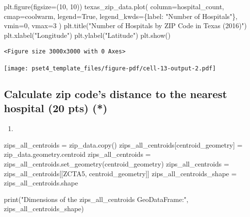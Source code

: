 \documentclass[
  letterpaper,
  DIV=11,
  numbers=noendperiod]{scrartcl}
\newenvironment{Shaded}{\begin{snugshade}}{\end{snugshade}}
\newcommand{\BuiltInTok}[1]{\textcolor[rgb]{0.00,0.23,0.31}{#1}}
\newcommand{\DecValTok}[1]{\textcolor[rgb]{0.68,0.00,0.00}{#1}}
\newcommand{\NormalTok}[1]{\textcolor[rgb]{0.00,0.23,0.31}{#1}}
\newcommand{\OperatorTok}[1]{\textcolor[rgb]{0.37,0.37,0.37}{#1}}
\newcommand{\StringTok}[1]{\textcolor[rgb]{0.13,0.47,0.30}{#1}}
\newcommand{\VariableTok}[1]{\textcolor[rgb]{0.07,0.07,0.07}{#1}}
\providecommand{\tightlist}{%
  \setlength{\itemsep}{0pt}\setlength{\parskip}{0pt}}\usepackage{longtable,booktabs,array}
\begin{document}
\begin{Shaded}
\begin{Highlighting}[]
\NormalTok{plt.figure(figsize}\OperatorTok{=}\NormalTok{(}\DecValTok{10}\NormalTok{, }\DecValTok{10}\NormalTok{))}
\NormalTok{texas\_zip\_data.plot(}
\NormalTok{    column}\OperatorTok{=}\StringTok{\textquotesingle{}hospital\_count\textquotesingle{}}\NormalTok{,}
\NormalTok{    cmap}\OperatorTok{=}\StringTok{\textquotesingle{}coolwarm\textquotesingle{}}\NormalTok{,}
\NormalTok{    legend}\OperatorTok{=}\VariableTok{True}\NormalTok{,}
\NormalTok{    legend\_kwds}\OperatorTok{=}\NormalTok{\{}\StringTok{\textquotesingle{}label\textquotesingle{}}\NormalTok{: }\StringTok{"Number of Hospitals"}\NormalTok{\},}
\NormalTok{    vmin}\OperatorTok{=}\DecValTok{0}\NormalTok{,}
\NormalTok{    vmax}\OperatorTok{=}\DecValTok{3}
\NormalTok{)}
\NormalTok{plt.title(}\StringTok{"Number of Hospitals by ZIP Code in Texas (2016)"}\NormalTok{)}
\NormalTok{plt.xlabel(}\StringTok{"Longitude"}\NormalTok{)}
\NormalTok{plt.ylabel(}\StringTok{"Latitude"}\NormalTok{)}
\NormalTok{plt.show()}
\end{Highlighting}
\end{Shaded}

\begin{verbatim}
<Figure size 3000x3000 with 0 Axes>
\end{verbatim}

\texttt{[image: pset4\_template\_files/figure-pdf/cell-13-output-2.pdf]}

\subsection{Calculate zip code's distance to the nearest hospital (20
pts)
(*)}\label{calculate-zip-codes-distance-to-the-nearest-hospital-20-pts}

\begin{enumerate}
\def\labelenumi{\arabic{enumi}.}
\tightlist
\item
\end{enumerate}

\begin{Shaded}
\begin{Highlighting}[]
\NormalTok{zips\_all\_centroids }\OperatorTok{=}\NormalTok{ zip\_data.copy()}
\NormalTok{zips\_all\_centroids[}\StringTok{\textquotesingle{}centroid\_geometry\textquotesingle{}}\NormalTok{] }\OperatorTok{=}\NormalTok{ zip\_data.geometry.centroid}
\NormalTok{zips\_all\_centroids }\OperatorTok{=}\NormalTok{ zips\_all\_centroids.set\_geometry(}\StringTok{\textquotesingle{}centroid\_geometry\textquotesingle{}}\NormalTok{)}
\NormalTok{zips\_all\_centroids }\OperatorTok{=}\NormalTok{ zips\_all\_centroids[[}\StringTok{\textquotesingle{}ZCTA5\textquotesingle{}}\NormalTok{, }\StringTok{\textquotesingle{}centroid\_geometry\textquotesingle{}}\NormalTok{]]}
\NormalTok{zips\_all\_centroids\_shape }\OperatorTok{=}\NormalTok{ zips\_all\_centroids.shape}

\BuiltInTok{print}\NormalTok{(}\StringTok{"Dimensions of the zips\_all\_centroids GeoDataFrame:"}\NormalTok{, zips\_all\_centroids\_shape)}
\end{Highlighting}
\end{Shaded}
\end{document}
